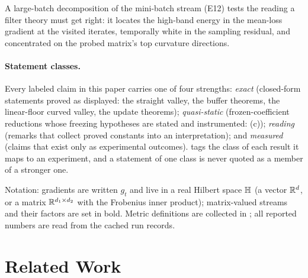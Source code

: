 \documentclass[11pt,a4paper]{article}
\theoremstyle{remark}
\begin{document}
\begin{itemize}
A large-batch decomposition of the mini-batch stream (E12) tests the reading a filter theory must get right: it locates the high-band energy in the mean-loss gradient at the visited iterates, temporally white in the sampling residual, and concentrated on the probed matrix's top curvature directions.
\end{itemize}
\paragraph{Statement classes.} Every labeled claim in this paper carries one of four strengths: \emph{exact} (closed-form statements proved as displayed: the straight valley, the buffer theorems, the linear-floor curved valley, the update theorems); \emph{quasi-static} (frozen-coefficient reductions whose freezing hypotheses are stated and instrumented: (c)); \emph{reading} (remarks that collect proved constants into an interpretation); and \emph{measured} (claims that exist only as experimental outcomes).
 tags the class of each result it maps to an experiment, and a statement of one class is never quoted as a member of a stronger one.

Notation: gradients are written $g_t$ and live in a real Hilbert space $\mathbb{H}$ (a vector $\mathbb{R}^d$, or a matrix $\mathbb{R}^{d_1\times d_2}$ with the Frobenius inner product); matrix-valued streams and their factors are set in bold.
Metric definitions are collected in ; all reported numbers are read from the cached run records.

\section{Related Work}
\label{sec:related}
\end{document}
